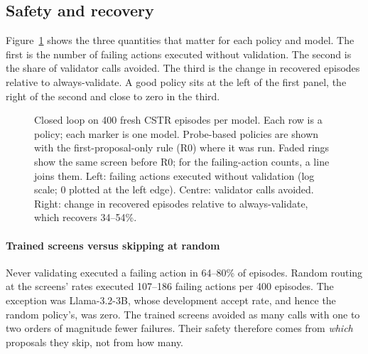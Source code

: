 \subsection{Safety and recovery}


Figure~\ref{fig:closedloop} shows the three quantities that matter for each policy and model. The first is the
number of failing actions executed without validation. The second is the share of validator calls avoided. The
third is the change in recovered episodes relative to always-validate. A good policy sits at the left of the first
panel, the right of the second and close to zero in the third.

\begin{figure}[!htbp]
\centering

\caption{Closed loop on 400 fresh CSTR episodes per model. Each row is a policy; each marker is one model.
Probe-based policies are shown with the first-proposal-only rule (R0) where it was run. Faded rings show the same
screen before R0; for the failing-action counts, a line joins them. Left: failing actions executed without
validation (log scale; 0 plotted at the left edge). Centre: validator calls avoided. Right: change in recovered
episodes relative to always-validate, which recovers 34--54\%.}
\label{fig:closedloop}
\end{figure}

\paragraph{Trained screens versus skipping at random} Never validating executed a failing action in 64--80\% of
episodes. Random routing at the screens' rates executed 107--186 failing actions per 400 episodes. The exception
was Llama-3.2-3B, whose development accept rate, and hence the random policy's, was zero. The trained screens
avoided as many calls with one to two orders of magnitude fewer failures. Their safety therefore comes from
\emph{which} proposals they skip, not from how many.

